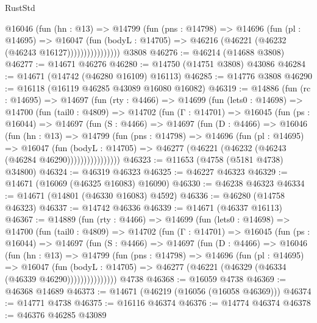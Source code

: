 \begin{lexlean}{RustStd}
\begin{coremodule}
                    @16046
                      (fun (hn : @13) =>
                      @14799
                        (fun (pns : @14798) =>
                        @14696
                          (fun (pl : @14695) =>
                          @16047
                            (fun (bodyL : @14705) =>
                            @46216 (@46221 (@46232 (@46243 @16127))))))))))))))))
    @3808
@46276 := @46214 (@14688 @3808)
@46277 := @14671 @46276
@46280 := @14750 (@14751 @3808) @43086
@46284 := @14671 (@14742 (@46280 @16109) @16113)
@46285 := @14776 @3808
@46290 := @16118 (@16119 @46285 @43089 @16080 @16082)
@46319 := @14886
    (fun (rc : @14695) =>
    @14697
      (fun (rty : @4466) =>
      @14699
        (fun (lets0 : @14698) =>
        @14700
          (fun (tail0 : @4809) =>
          @14702
            (fun (Γ : @14701) =>
            @16045
              (fun (ps : @16044) =>
              @14697
                (fun (S : @4466) =>
                @14697
                  (fun (D : @4466) =>
                  @16046
                    (fun (hn : @13) =>
                    @14799
                      (fun (pns : @14798) =>
                      @14696
                        (fun (pl : @14695) =>
                        @16047
                          (fun (bodyL : @14705) =>
                          @46277 (@46221 (@46232 (@46243 (@46284 @46290))))))))))))))))
@46323 := @11653 (@4758 (@5181 @4738) @34800)
@46324 := @46319 @46323
@46325 := @46227 @46323
@46329 := @14671 (@16069 (@46325 @16083) @16090)
@46330 := @46238 @46323
@46334 := @14671 (@14801 (@46330 @16083) @4592)
@46336 := @46280 (@14758 @46323)
@46337 := @14742 @46336
@46339 := @14671 (@46337 @16113)
@46367 := @14889
    (fun (rty : @4466) =>
    @14699
      (fun (lets0 : @14698) =>
      @14700
        (fun (tail0 : @4809) =>
        @14702
          (fun (Γ : @14701) =>
          @16045
            (fun (ps : @16044) =>
            @14697
              (fun (S : @4466) =>
              @14697
                (fun (D : @4466) =>
                @16046
                  (fun (hn : @13) =>
                  @14799
                    (fun (pns : @14798) =>
                    @14696
                      (fun (pl : @14695) =>
                      @16047
                        (fun (bodyL : @14705) =>
                        @46277 (@46221 (@46329 (@46334 (@46339 @46290)))))))))))))))
    @4738
@46368 := @16059 @4738
@46369 := @46368 @14689
@46373 := @14671 (@46219 (@16056 (@16058 @46369)))
@46374 := @14771 @4738
@46375 := @16116 @46374
@46376 := @14774 @46374
@46378 := @46376 @46285 @43089

\end{coremodule}
\end{lexlean}
